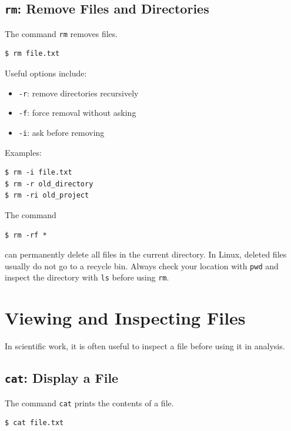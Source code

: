 \subsection{\texttt{rm}: Remove Files and Directories}

The command \texttt{rm} removes files.

\begin{lstlisting}
$ rm file.txt
\end{lstlisting}

Useful options include:

\begin{itemize}
\item \texttt{-r}: remove directories recursively
\item \texttt{-f}: force removal without asking
\item \texttt{-i}: ask before removing
\end{itemize}

Examples:

\begin{lstlisting}
$ rm -i file.txt
$ rm -r old_directory
$ rm -ri old_project
\end{lstlisting}

\begin{warnbox}
The command
\begin{lstlisting}
$ rm -rf *
\end{lstlisting}
can permanently delete all files in the current directory. In Linux,
deleted files usually do not go to a recycle bin. Always check your
location with \texttt{pwd} and inspect the directory with \texttt{ls}
before using \texttt{rm}.
\end{warnbox}

\section{Viewing and Inspecting Files}

In scientific work, it is often useful to inspect a file before using it
in analysis.

\subsection{\texttt{cat}: Display a File}

The command \texttt{cat} prints the contents of a file.

\begin{lstlisting}
$ cat file.txt
\end{lstlisting}

